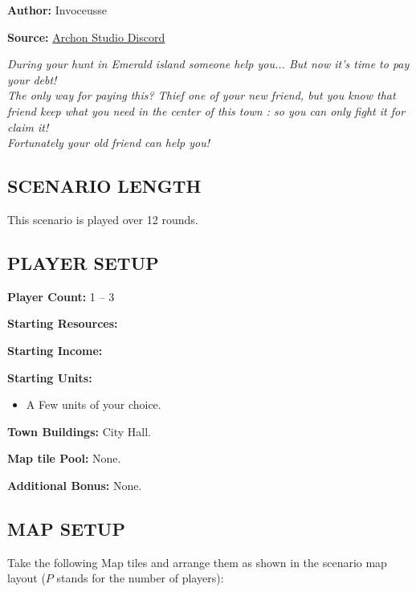 
\begin{multicols*}{2}

\textbf{Author:} Invoceusse

\textbf{Source:} \href{https://discord.com/channels/740870068178649108/1230194988395270195}{Archon Studio Discord}

\textit{During your hunt in Emerald island someone help you... But now it's time to pay your debt!\\
The only way for paying this? Thief one of your new friend, but you know that friend keep what you need in the center of this town : so you can only fight it for claim it!\\
Fortunately your old friend can help you!
}

\subsection*{\MakeUppercase{Scenario Length}}

This scenario is played over 12 rounds.

\subsection*{\MakeUppercase{Player setup}}

\textbf{Player Count:} 1 -- 3

\textbf{Starting Resources:}\par
{}

\textbf{Starting Income:}\par
{}

\textbf{Starting Units:}
\begin{itemize}
  \item A Few  units of your choice.
\end{itemize}

\textbf{Town Buildings:} City Hall.

\textbf{Map tile Pool:} None.

\textbf{Additional Bonus:} None.

\subsection*{\MakeUppercase{Map Setup}}

Take the following Map tiles and arrange them as shown in the scenario map layout ($P$ stands for the number of players):


\end{multicols*}
